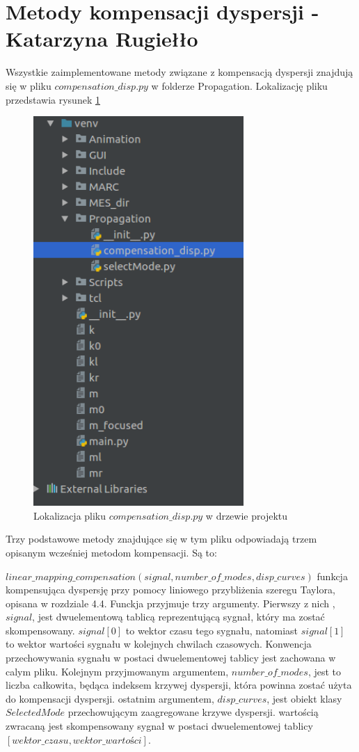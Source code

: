\section{Metody kompensacji dyspersji - Katarzyna Rugiełło}

Wszystkie zaimplementowane metody związane z kompensacją dyspersji znajdują się w pliku $compensation\_disp.py$ w folderze Propagation. Lokalizację pliku przedstawia rysunek \ref{fig:compensation}
\begin{figure}[h]
\centering
\includegraphics[width=8cm]{Zdjecia/5/kasia/compensation}
\caption{Lokalizacja pliku $compensation\_disp.py$ w drzewie projektu}
\label{fig:compensation}
\end{figure}

Trzy podstawowe metody znajdujące się w tym pliku odpowiadają trzem opisanym wcześniej metodom kompensacji. Są to:

$linear\_mapping\_compensation(signal, number\_of\_modes, disp\_curves)$ funkcja kompensująca dyspersję przy pomocy liniowego przybliżenia szeregu Taylora, opisana w rozdziale 4.4. Funckja przyjmuje trzy argumenty. Pierwszy z nich , $signal$, jest dwuelementową tablicą reprezentującą sygnał, który ma zostać skompensowany. $signal[0]$ to wektor czasu tego sygnału, natomiast $signal[1]$ to wektor wartości sygnału w kolejnych chwilach czasowych. Konwencja przechowywania sygnału w postaci dwuelementowej tablicy jest zachowana w calym pliku. Kolejnym przyjmowanym argumentem, $number\_of\_modes$, jest to liczba całkowita, będąca indeksem krzywej dyspersji, która powinna zostać użyta do kompensacji dyspersji. ostatnim argumentem, $disp\_curves$, jest obiekt klasy $SelectedMode$ przechowującym zaagregowane krzywe dyspersji. wartością zwracaną jest skompensowany sygnał w postaci dwuelementowej tablicy $[wektor\_czasu, wektor\_wartości]$.

